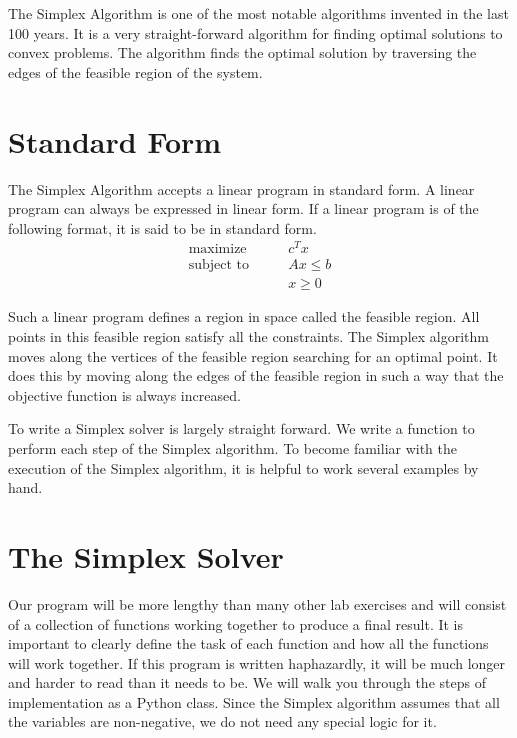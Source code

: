 \label{lab:Simplex}

The Simplex Algorithm is one of the most notable algorithms invented in the last 100 years.
It is a very straight-forward algorithm for finding optimal solutions to convex problems.
The algorithm finds the optimal solution by traversing the edges of the feasible region of the system.

\section*{Standard Form}
The Simplex Algorithm accepts a linear program in standard form.
A linear program can always be expressed in linear form.
If a linear program is of the following format, it is said to be in standard form.
\begin{align*}
\text{maximize}\qquad & c^T x \\
\text{subject to}\qquad & A x \leq b \\
 & x \geq 0
\end{align*}

Such a linear program defines a region in space called the feasible region.
All points in this feasible region satisfy all the constraints.
The Simplex algorithm moves along the vertices of the feasible region searching for an optimal point.
It does this by moving along the edges of the feasible region in such a way that the objective function is always increased.

To write a Simplex solver is largely straight forward.
We write a function to perform each step of the Simplex algorithm.
To become familiar with the execution of the Simplex algorithm, it is helpful to work several examples by hand.

\section*{The Simplex Solver}
Our program will be more lengthy than many other lab exercises and will consist of a collection of functions working together to produce a final result.
It is important to clearly define the task of each function and how all the functions will work together.
If this program is written haphazardly, it will be much longer and harder to read than it needs to be.
We will walk you through the steps of implementation as a Python class.
Since the Simplex algorithm assumes that all the variables are non-negative, we do not need any special logic for it.

